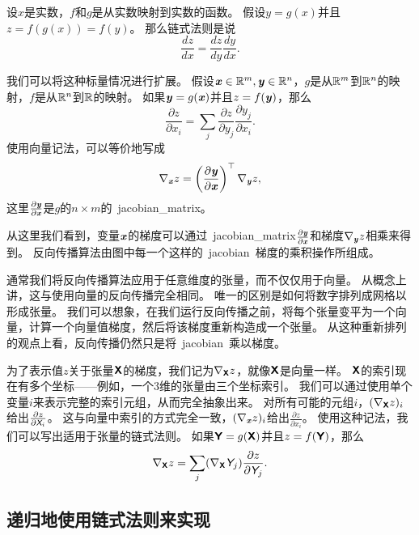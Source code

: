 设$x$是实数，$f$和$g$是从实数映射到实数的函数。
假设$y=g(x)$并且$z=f(g(x))=f(y)$。
那么链式法则是说
\begin{equation}
\frac{dz}{dx}=\frac{dz}{dy} \frac{dy}{dx}.
\label{eq:6.44}
\end{equation}

我们可以将这种标量情况进行扩展。
假设$\boldsymbol{\mathit{x}}\in \mathbb{R}^m, \boldsymbol{\mathit{y}}\in \mathbb{R}^n$，$g$是从$\mathbb{R}^m$到$\mathbb{R}^n$的映射，$f$是从$\mathbb{R}^n$到$\mathbb{R}$的映射。
如果$\boldsymbol{\mathit{y}}=g(\boldsymbol{\mathit{x}})$并且$z=f(\boldsymbol{\mathit{y}})$，那么
\begin{equation}
\frac{\partial z}{\partial x_i} = \sum_j \frac{\partial z}{\partial y_j} \frac{\partial y_j}{\partial x_i}.
\end{equation}
使用向量记法，可以等价地写成
\begin{equation}
\nabla_{\boldsymbol{\mathit{x}}}z = \left ( \frac{\partial \boldsymbol{\mathit{y}}}{\partial \boldsymbol{\mathit{x}}} \right )^\top \nabla_{\boldsymbol{\mathit{y}}} z,
\end{equation}
这里$\frac{\partial \boldsymbol{\mathit{y}}}{\partial \boldsymbol{\mathit{x}}}$是$g$的$n\times m$的~\gls{jacobian_matrix}。

从这里我们看到，变量$\boldsymbol{\mathit{x}}$的梯度可以通过~\gls{jacobian_matrix}$\frac{\partial \boldsymbol{\mathit{y}}}{\partial \boldsymbol{\mathit{x}}}$和梯度$\nabla_{\boldsymbol{\mathit{y}}} z$相乘来得到。
反向传播算法由图中每一个这样的~\gls{jacobian}~梯度的乘积操作所组成。


通常我们将反向传播算法应用于任意维度的张量，而不仅仅用于向量。
从概念上讲，这与使用向量的反向传播完全相同。 
唯一的区别是如何将数字排列成网格以形成张量。 
我们可以想象，在我们运行反向传播之前，将每个张量变平为一个向量，计算一个向量值梯度，然后将该梯度重新构造成一个张量。
从这种重新排列的观点上看，反向传播仍然只是将~\gls{jacobian}~乘以梯度。


为了表示值$z$关于张量$\textsf{\textbf{X}}$的梯度，我们记为$\nabla_{\textsf{\textbf{X}}} z$，就像$\textsf{\textbf{X}}$是向量一样。
$\textsf{\textbf{X}}$的索引现在有多个坐标——例如，一个3维的张量由三个坐标索引。
我们可以通过使用单个变量$i$来表示完整的索引元组，从而完全抽象出来。
对所有可能的元组$i$，$(\nabla_{\textsf{\textbf{X}}} z)_i$给出$\frac{\partial z}{\partial \textit{\textsf{X}}_i}$。
这与向量中索引的方式完全一致，$(\nabla_{\boldsymbol{\mathit{x}}} z)_i$给出$\frac{\partial z}{\partial x_i}$。
使用这种记法，我们可以写出适用于张量的链式法则。
如果$\textsf{\textbf{Y}}=g(\textsf{\textbf{X}})$并且$z=f(\textsf{\textbf{Y}})$，那么
\begin{equation}
  \nabla_{\textsf{\textbf{X}}} z = \sum_j (\nabla_{\textsf{\textbf{X}}} \textit{\textsf{Y}}_j)\frac{\partial z}{\partial \textit{\textsf{Y}}_j}.
  \label{eq:6.47}
\end{equation}

\subsection{递归地使用链式法则来实现}
\label{sec:recursively_applying_the_chain_rule_to_obtain_backprop}

